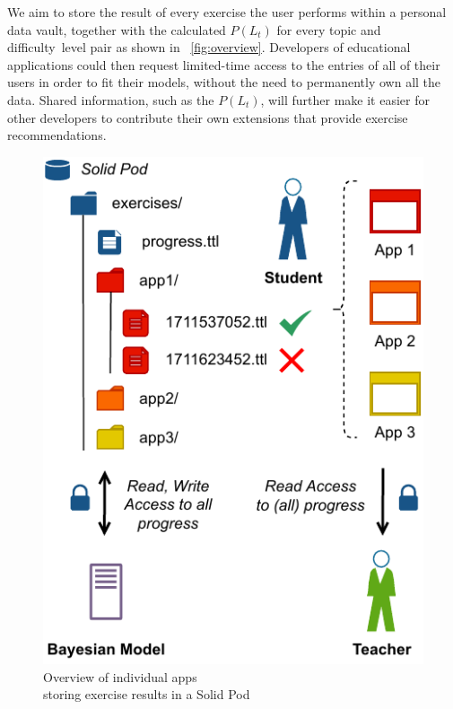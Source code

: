 We aim to store the result of every exercise the user performs within a personal data vault, together with the calculated $P(L_t)$ for every topic and difficulty~level pair as shown in \figurename~\ref{fig:overview}. Developers of educational applications could then request limited-time access to the entries of all of their users in order to fit their models, without the need to permanently own all the data. Shared information, such as the $P(L_t)$, will further make it easier for other developers to contribute their own extensions that provide exercise recommendations.

\begin{figure}[htb]
\begin{minipage}[t]{0.39\textwidth}
\vspace{0pt}
\includegraphics[width=\textwidth]{images/SoSyYoshi.drawio.pdf}
\vspace{0pt}
\caption{Overview of individual apps \\ 
storing exercise results in a Solid Pod}

\end{minipage}
\end{figure}

